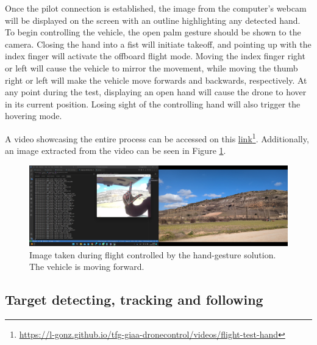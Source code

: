 Once the pilot connection is established, the image from the computer's webcam will be displayed on the screen with an outline highlighting any detected hand. To begin controlling the vehicle, the open palm gesture should be shown to the camera. Closing the hand into a fist will initiate takeoff, and pointing up with the index finger will activate the offboard flight mode. Moving the index finger right or left will cause the vehicle to mirror the movement, while moving the thumb right or left will make the vehicle move forwards and backwards, respectively. At any point during the test, displaying an open hand will cause the drone to hover in its current position. Losing sight of the controlling hand will also trigger the hovering mode.


A video showcasing the entire process can be accessed on this \href{https://l-gonz.github.io/tfg-giaa-dronecontrol/videos/flight-test-hand}{link}\footnote{\url{https://l-gonz.github.io/tfg-giaa-dronecontrol/videos/flight-test-hand}}. Additionally, an image extracted from the video can be seen in Figure \ref{fig:flight-test-hand}.

\begin{figure}
  \centering
  \includegraphics[width=\textwidth, keepaspectratio]{img/video-field-test-hand.png}
  \caption{Image taken during flight controlled by the hand-gesture solution. The vehicle is moving forward.}
  \label{fig:flight-test-hand}
\end{figure}


\subsection{Target detecting, tracking and following}
\label{subsec:fl-test-5}

